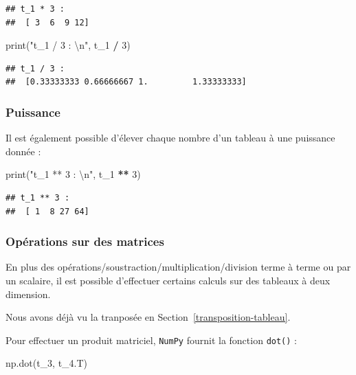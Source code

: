 \documentclass[12pt,]{book}
\newenvironment{Shaded}{\begin{snugshade}}{\end{snugshade}}
\newcommand{\DecValTok}[1]{\textcolor[rgb]{0.00,0.00,0.81}{#1}}
\newcommand{\CharTok}[1]{\textcolor[rgb]{0.31,0.60,0.02}{#1}}
\newcommand{\StringTok}[1]{\textcolor[rgb]{0.31,0.60,0.02}{#1}}
\newcommand{\OperatorTok}[1]{\textcolor[rgb]{0.81,0.36,0.00}{\textbf{#1}}}
\newcommand{\BuiltInTok}[1]{#1}
\newcommand{\NormalTok}[1]{#1}
\numberwithin{equation}{section}
\numberwithin{countremarque}{section}
\begin{document}
\begin{lstlisting}
## t_1 * 3 : 
##  [ 3  6  9 12]
\end{lstlisting}

\begin{Shaded}
\begin{Highlighting}[]
\BuiltInTok{print}\NormalTok{(}\StringTok{"t_1 / 3 : }\CharTok{\textbackslash{}n}\StringTok{"}\NormalTok{, t_1 }\OperatorTok{/} \DecValTok{3}\NormalTok{)}
\end{Highlighting}
\end{Shaded}

\begin{lstlisting}
## t_1 / 3 : 
##  [0.33333333 0.66666667 1.         1.33333333]
\end{lstlisting}

\subsubsection{Puissance}\label{puissance-1}

Il est également possible d'élever chaque nombre d'un tableau à une
puissance donnée :

\begin{Shaded}
\begin{Highlighting}[]
\BuiltInTok{print}\NormalTok{(}\StringTok{"t_1 ** 3 : }\CharTok{\textbackslash{}n}\StringTok{"}\NormalTok{, t_1 }\OperatorTok{**} \DecValTok{3}\NormalTok{)}
\end{Highlighting}
\end{Shaded}

\begin{lstlisting}
## t_1 ** 3 : 
##  [ 1  8 27 64]
\end{lstlisting}

\subsubsection{Opérations sur des
matrices}\label{operations-sur-des-matrices}

En plus des opérations/soustraction/multiplication/division terme à
terme ou par un scalaire, il est possible d'effectuer certains calculs
sur des tableaux à deux dimension.

Nous avons déjà vu la tranposée en Section~\ref{transposition-tableau}.

Pour effectuer un produit matriciel, \texttt{NumPy} fournit la fonction
\texttt{dot()} :

\begin{Shaded}
\begin{Highlighting}[]
\NormalTok{np.dot(t_3, t_4.T)}
\end{Highlighting}
\end{Shaded}
\end{document}
